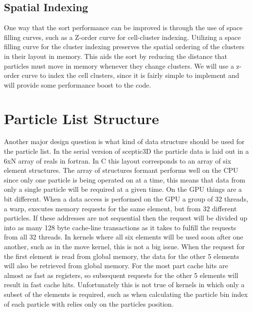 \subsection{Spatial Indexing}

One way that the sort performance can be improved is through the use of space filling curves, such as a Z-order curve for cell-cluster indexing. Utilizing a space filling curve for the cluster indexing preserves the spatial ordering of the clusters in their layout in memory. This aids the sort by reducing the distance that particles must move in memory whenever they change clusters. We will use a z-order curve to index the cell clusters, since it is fairly simple to implement and will provide some performance boost to the code.

	\section{Particle List Structure}

Another major design question is what kind of data structure should be used for the particle list. In the serial version of sceptic3D the particle data is laid out in a 6xN array of reals in fortran. In C this layout corresponds to an array of six element structures. The array of structures formant performs well on the CPU since only one particle is being operated on at a time, this means that data from only a single particle will be required at a given time. On the GPU things are a bit different. When a data access is performed on the GPU a group of 32 threads, a warp, executes memory requests for the same element, but from 32 different particles. If these addresses are not sequential then the request will be divided up into as many 128 byte cache-line transactions as it takes to fulfill the requests from all 32 threads. In kernels where all six elements will be used soon after one another, such as in the move kernel, this is not a big issue. When the request for the first element is read from global memory, the data for the other 5 elements will also be retrieved from global memory. For the most part cache hits are almost as fast as registers, so subsequent requests for the other 5 elements will result in fast cache hits. Unfortunately this is not true of kernels in which only a subset of the elements is required, such as when calculating the particle bin index of each particle with relies only on the particles position. \cite{NVIDIACorporation2011}

